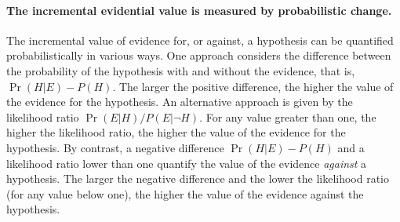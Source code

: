 \documentclass[10pt]{article}
\begin{document}
\paragraph{The incremental evidential value is measured by probabilistic change.}
The incremental value of evidence for, or against, a hypothesis 
can be quantified probabilistically in various ways. 
One approach considers the difference between the probability of 
the hypothesis with and without the evidence, that is, $\Pr(H | E) - P(H)$.
The larger the positive difference, the higher the value of the evidence 
for the hypothesis. 
An alternative approach is given by the likelihood ratio $\Pr(E|H)/P(E| \neg H)$. 
For any value greater than one, the higher the likelihood ratio, 
the higher the value of the evidence for the hypothesis. 
%
%
By contrast, a negative difference $\Pr(H | E) - P(H)$ and a likelihood ratio lower than one 
quantify the value of the evidence \textit{against} a hypothesis.
The larger the negative difference and the lower the likelihood ratio (for any value below one), 
the higher the value of the evidence against the hypothesis.
\end{document}
